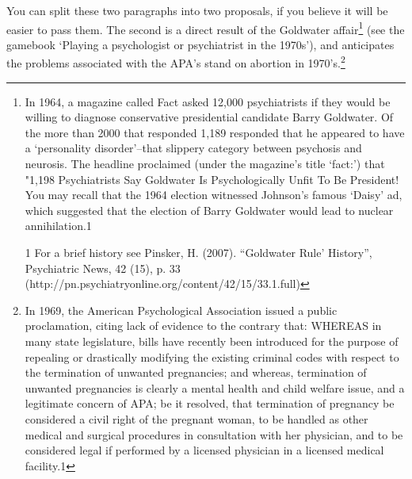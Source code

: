 You can split these two paragraphs into two proposals, if you believe it will be easier to pass them. The second is a direct result of the Goldwater affair\footnote{In 1964, a magazine called Fact asked 12,000 psychiatrists if they would be willing to diagnose conservative presidential candidate Barry Goldwater. Of the more than 2000 that responded 1,189 responded that he appeared to have a `personality disorder'--that slippery category between psychosis and neurosis. The headline proclaimed (under the magazine's title `fact:') that "1,198 Psychiatrists Say Goldwater Is Psychologically Unfit To Be President! You may recall that the 1964 election witnessed Johnson's famous `Daisy' ad, which suggested that the election of Barry Goldwater would lead to nuclear annihilation.⁠1 

1 For a brief history see Pinsker, H. (2007). ``Goldwater Rule' History'', Psychiatric News, 42 (15), p. 33 (http:\slash \slash pn.psychiatryonline.org\slash content\slash 42\slash 15\slash 33.1.full)} (see the gamebook `Playing a psychologist or psychiatrist in the 1970s'), and anticipates the problems associated with the APA's stand on abortion in 1970's.\footnote{In 1969, the American Psychological Association issued a public proclamation, citing lack of evidence to the contrary that:
WHEREAS in many state legislature, bills have recently been introduced for the purpose of repealing or drastically modifying the existing criminal codes with respect to the termination of unwanted pregnancies; and whereas, termination of unwanted pregnancies is clearly a mental health and child welfare issue, and a legitimate concern of APA; be it resolved, that termination of pregnancy be considered a civil right of the pregnant woman, to be handled as other medical and surgical procedures in consultation with her physician, and to be considered legal if performed by a licensed physician in a licensed medical facility.⁠1

}
